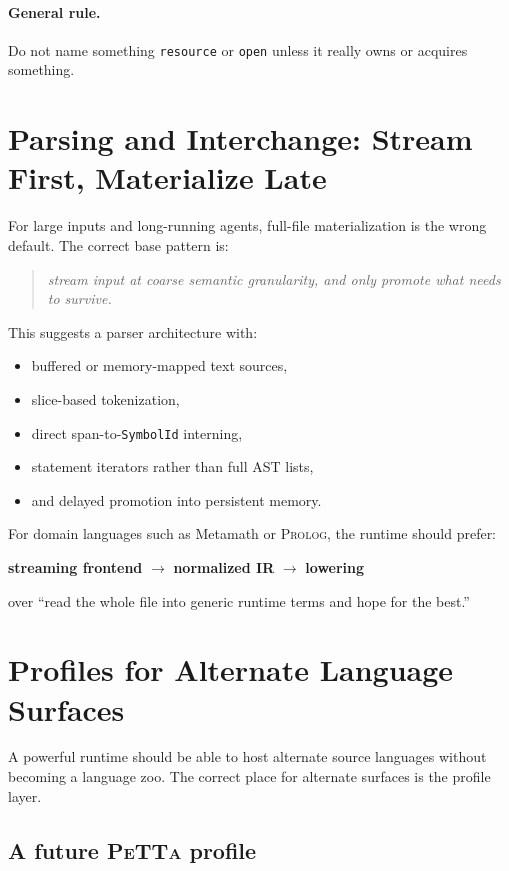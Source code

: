 \documentclass[11pt]{article}
\newcommand{\petta}{\textsc{PeTTa}}
\newcommand{\prolog}{\textsc{Prolog}}
\newcommand{\symid}{\texttt{SymbolId}}
\begin{document}
\paragraph{General rule.}
Do not name something \texttt{resource} or \texttt{open} unless it really owns or acquires something.

\section{Parsing and Interchange: Stream First, Materialize Late}

For large inputs and long-running agents, full-file materialization is the wrong default. The correct base pattern is:
\begin{quote}
\emph{stream input at coarse semantic granularity, and only promote what needs to survive.}
\end{quote}

This suggests a parser architecture with:
\begin{itemize}[leftmargin=2em]
  \item buffered or memory-mapped text sources,
  \item slice-based tokenization,
  \item direct span-to-\symid{} interning,
  \item statement iterators rather than full AST lists,
  \item and delayed promotion into persistent memory.
\end{itemize}

For domain languages such as Metamath or \prolog{}, the runtime should prefer:
\begin{center}
\textbf{streaming frontend} $\rightarrow$ \textbf{normalized IR} $\rightarrow$ \textbf{lowering}
\end{center}

over ``read the whole file into generic runtime terms and hope for the best.''

\section{Profiles for Alternate Language Surfaces}

A powerful runtime should be able to host alternate source languages without becoming a language zoo. The correct place for alternate surfaces is the profile layer.

\subsection{A future \petta{} profile}
\end{document}
